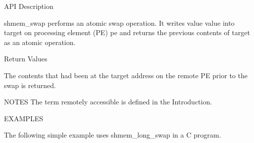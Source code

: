 API Description

       shmem_swap  performs  an	 atomic	 swap operation. It writes value value
       into target on processing element (PE)  pe  and	returns	 the  previous
       contents of target as an atomic operation.

Return Values

       The contents that had been at the target address on the remote PE prior
       to the swap is returned.

NOTES
       The term remotely accessible is defined in the Introduction.

EXAMPLES

	The  following  simple  example uses  shmem_long_swap  in a C program.           

        

